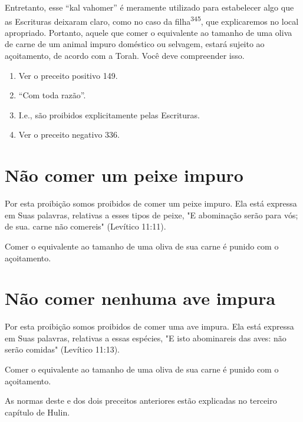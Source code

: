 Entretanto, esse ``kal vahomer'' é meramente utilizado para esta­belecer
algo que as Escrituras deixaram claro, como no caso da
filha\textsuperscript{345}, que explicaremos no local apropriado.
Portanto, aquele que comer o equivalente ao tamanho de uma oliva de
carne de um animal impuro doméstico ou selva­gem, estará sujeito ao
açoitamento, de acordo com a Torah. Você deve com­preender isso.


\begin{enumerate}
\def\labelenumi{\arabic{enumi}.}
\setcounter{enumi}{341}
\item
 
 Ver o preceito positivo 149.
 
\item
 
 ``Com toda razão''.
 
\item
 
 I.e., são proibidos explicitamente pelas Escrituras.
 
\item
 
 Ver o preceito negativo 336.
 
\end{enumerate}



\section{Não comer um peixe impuro}

Por esta proibição somos proibidos de comer um peixe impuro. Ela está
expressa em Suas palavras, relativas a esses tipos de peixe, "E
abominação serão para vós; de sua. carne não comereis" (Levítico 11:11).

Comer o equivalente ao tamanho de uma oliva de sua carne é puni­do com o
açoitamento.

\section{Não comer nenhuma ave impura}

Por esta proibição somos proibidos de comer uma ave impura. Ela está
expressa em Suas palavras, relativas a essas espécies, "E isto
abominareis das aves: não serão comidas" (Levítico 11:13).

Comer o equivalente ao tamanho de uma oliva de sua carne é puni­do com o
açoitamento.

As normas deste e dos dois preceitos anteriores estão explicadas no
terceiro capítulo de Hulin.

